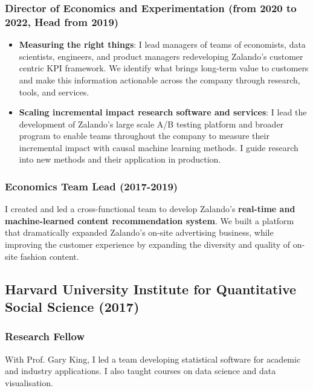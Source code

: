 \documentclass[a4paper]{article}
\begin{document}
\subsubsection*{Director of Economics and Experimentation (from 2020 to 2022, Head from 2019)}

\begin{itemize}

  \item \textbf{Measuring the right things}: I lead managers of teams of economists, data scientists, engineers, and product managers redeveloping Zalando's customer centric KPI framework. We identify what brings long-term value to customers and make this information actionable across the company through research, tools, and services.

  \item \textbf{Scaling incremental impact research software and services}: I lead the development of Zalando's large scale A/B testing platform and broader program to enable teams throughout the company to measure their incremental impact with causal machine learning methods. I guide research into new methods and their application in production.

\end{itemize}
  
\subsubsection*{Economics Team Lead (2017-2019)}

I created and led a cross-functional team to develop Zalando's \textbf{real-time and machine-learned content recommendation system}. We built a platform that dramatically expanded Zalando's on-site advertising business, while improving the customer experience by expanding the diversity and quality of on-site fashion content.

\subsection*{Harvard University Institute for Quantitative Social Science (2017)}

\subsubsection*{Research Fellow}

With Prof. Gary King, I led a team developing statistical software for academic and industry applications. I also taught courses on data science and data visualisation.
\end{document}
